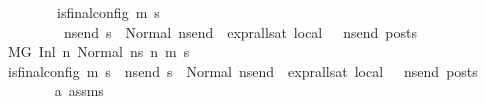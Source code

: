 \begin{isabellebody}
\ \ \ \ \ \ \ \ {\isacharparenleft}{\kern0pt}is{\isacharunderscore}{\kern0pt}final{\isacharunderscore}{\kern0pt}config\ {\isacharparenleft}{\kern0pt}m{}{\isacharcomma}{\kern0pt}\ s{}{\isacharparenright}{\kern0pt}\ {\isasymLongrightarrow}\ \isanewline
\ \ \ \ \ \ \ \ \ {\isacharparenleft}{\kern0pt}{\isasymforall}ns{\isacharunderscore}{\kern0pt}end{\isachardot}{\kern0pt}\ s{}\ {\isacharequal}{\kern0pt}\ Normal\ ns{\isacharunderscore}{\kern0pt}end\ {\isasymlongrightarrow}\ {\isacharparenleft}{\kern0pt}expr{\isacharunderscore}{\kern0pt}all{\isacharunderscore}{\kern0pt}sat\ {\isasymLambda}{}{\isacharunderscore}{\kern0pt}local\ {\isasymGamma}\ {\isasymOmega}\ ns{\isacharunderscore}{\kern0pt}end{\isacharparenright}{\kern0pt}\ posts{\isacharparenright}{\kern0pt}{\isacharparenright}{\kern0pt}{\isachardoublequoteclose}\ \isanewline
\ \ \isamarkupfalse%
\ {\isacharminus}{\kern0pt}\isanewline
\ \ \ \ \isamarkupfalse%
\ {\isachardoublequoteopen}{\isacharparenleft}{\kern0pt}M{\isacharcomma}{\kern0pt}{\isasymLambda}{\isacharcomma}{\kern0pt}{\isasymGamma}{\isacharcomma}{\kern0pt}{\isasymOmega}{\isacharcomma}{\kern0pt}G\ {\isasymturnstile}{\isacharparenleft}{\kern0pt}Inl\ n{}{\isacharcomma}{\kern0pt}\ Normal\ ns{}{\isacharparenright}{\kern0pt}\ {\isacharminus}{\kern0pt}n{\isasymrightarrow}{\isacharasterisk}{\kern0pt}\ {\isacharparenleft}{\kern0pt}m{}{\isacharcomma}{\kern0pt}\ s{}{\isacharparenright}{\kern0pt}{\isacharparenright}{\kern0pt}{\isachardoublequoteclose}\isanewline
\ \ \ \ \isamarkupfalse%
\ {\isachardoublequoteopen}{\isacharparenleft}{\kern0pt}is{\isacharunderscore}{\kern0pt}final{\isacharunderscore}{\kern0pt}config\ {\isacharparenleft}{\kern0pt}m{}{\isacharcomma}{\kern0pt}\ s{}{\isacharparenright}{\kern0pt}\ {\isasymLongrightarrow}\ {\isacharparenleft}{\kern0pt}{\isasymforall}ns{\isacharunderscore}{\kern0pt}end{\isachardot}{\kern0pt}\ s{}\ {\isacharequal}{\kern0pt}\ Normal\ ns{\isacharunderscore}{\kern0pt}end\ {\isasymlongrightarrow}\ {\isacharparenleft}{\kern0pt}expr{\isacharunderscore}{\kern0pt}all{\isacharunderscore}{\kern0pt}sat\ {\isasymLambda}{}{\isacharunderscore}{\kern0pt}local\ {\isasymGamma}\ {\isasymOmega}\ ns{\isacharunderscore}{\kern0pt}end{\isacharparenright}{\kern0pt}\ posts{\isacharparenright}{\kern0pt}{\isacharparenright}{\kern0pt}{\isachardoublequoteclose}\ \isanewline
\ \ \ \ \ \ \isamarkupfalse%
\ a{}\ assms\ \isamarkupfalse%

\end{isabellebody}
